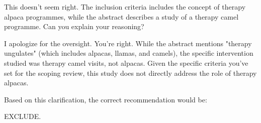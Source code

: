 \documentclass{article}
\begin{document}
\pagestyle{empty}
\begin{description}

  \User This doesn't seem right. The inclusion criteria includes the concept of
  therapy alpaca programmes, while the abstract describes a study of a therapy
  camel programme. Can you explain your reasoning?

  \GPT I apologize for the oversight. You're right. While the abstract mentions
  "therapy ungulates" (which includes alpacas, llamas, and camels), the
  specific intervention studied was therapy camel visits, not alpacas. Given
  the specific criteria you've set for the scoping review, this study does not
  directly address the role of therapy alpacas.

  Based on this clarification, the correct recommendation would be:

  EXCLUDE.

\end{description}
\end{document}
